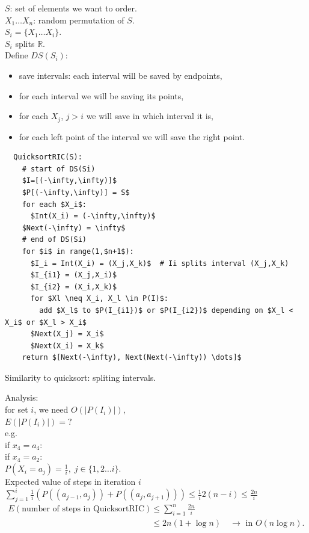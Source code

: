 \documentclass[a4paper, 12pt]{book}
\theoremstyle{definition}
\theoremstyle{remark}
\newcommand{\R}{\mathbb{R}}
\begin{document}
$S$: set of elements we want to order. \\
$X_1 \dots X_n$: random permutation of $S$. \\
$S_i = \{X_1 \dots X_i\}$. \\
$S_i$ splits $\R$. \\
Define $DS(S_i)$:
\begin{itemize}
  \item save intervals: each interval will be saved by endpoints,
  \item for each interval we will be saving its points,
  \item for each $X_j$, $j > i$ we will save in which interval it is,
  \item for each left point of the interval we will save the right point.
\end{itemize}
\begin{lstlisting}
  QuicksortRIC(S):
    # start of DS(Si)
    $I=[(-\infty,\infty)]$
    $P[(-\infty,\infty)] = S$
    for each $X_i$:
      $Int(X_i) = (-\infty,\infty)$
    $Next(-\infty) = \infty$
    # end of DS(Si)
    for $i$ in range(1,$n+1$):
      $I_i = Int(X_i) = (X_j,X_k)$  # Ii splits interval (X_j,X_k)
      $I_{i1} = (X_j,X_i)$
      $I_{i2} = (X_i,X_k)$
      for $Xl \neq X_i, X_l \in P(I)$: 
        add $X_l$ to $P(I_{i1})$ or $P(I_{i2})$ depending on $X_l < X_i$ or $X_l > X_i$
      $Next(X_j) = X_i$
      $Next(X_i) = X_k$
    return $[Next(-\infty), Next(Next(-\infty)) \dots]$
\end{lstlisting}
Similarity to quicksort: spliting intervals.



Analysis: \\
for set $i$, we need $O\left(|P(I_i)|\right)$, \\
$E\left(|P(I_i)|\right) = ?$ \\
e.g. \\
if $x_4 = a_4$: \\
if $x_4 = a_2$: \\
$P(X_i = a_j) = \frac{1}{i}, \; j \in \{1, 2 \dots i\}$. \\
Expected value of steps in iteration $i$ \\
$\sum_{j=1}^{i} \frac{1}{i} \left(P\left((a_{j-1},a_j)\right) + P\left((a_j,a_{j+1})\right)\right)
\leq \frac{1}{i} 2 (n-i) \leq \frac{2n}{i}$ \\
\begin{align*}
  E \left(\text{number of steps in QuicksortRIC}\right)
  &\leq \sum_{i=1}^{n} \frac{2n}{i} \\
  &\leq 2n (1 + \log n) \quad \to \text{ in } O(n \log n).
\end{align*}
\end{document}
